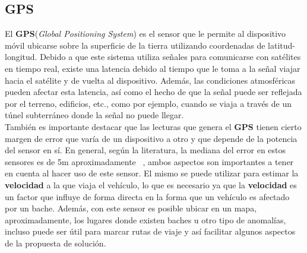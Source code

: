 	\subsection{GPS}
		El \textbf{GPS}(\emph{Global Positioning System}) es el sensor que le permite al dispositivo móvil ubicarse sobre la
		superficie de la tierra utilizando coordenadas de latitud-longitud. Debido a que este sistema utiliza señales para
		comunicarse con satélites en tiempo real, existe una latencia debido al tiempo que le toma a la señal viajar hacia el
		satélite y de vuelta al dispositivo. Además, las condiciones atmosféricas pueden afectar esta latencia, así como el hecho
		de que la señal puede ser reflejada por el terreno, edificios, etc., como por ejemplo, cuando se viaja a través de un
		túnel subterráneo donde la señal no puede llegar.\\
		\indent También es importante destacar que las lecturas que genera el \textbf {GPS} tienen cierto margen de error que varía
		de un dispositivo a otro y que depende de la potencia del sensor en sí. En general, según la literatura, la mediana del error
		en estos sensores es de 5m aproximadamente ~, ambos aspectos son importantes a tener en cuenta
		al hacer uso de este sensor. El mismo se puede utilizar para estimar la \textbf{velocidad} a la que viaja el vehículo, lo que
		es necesario ya que la \textbf{velocidad} es un factor que influye de forma directa en la forma que un vehículo es afectado por
		un bache. Además, con este sensor es posible ubicar en un mapa, aproximadamente, los lugares donde existen baches u otro tipo
		de anomalías, incluso puede ser útil para marcar rutas de viaje y así facilitar algunos aspectos de la propuesta de solución.

